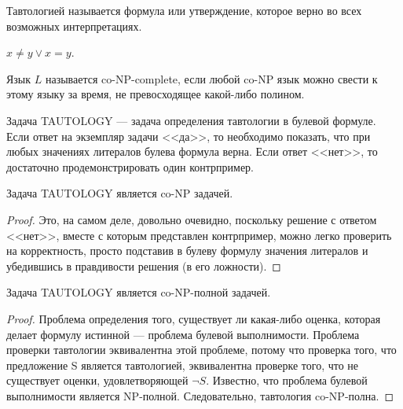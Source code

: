     
    \begin{Def}[Тавтология]
        Тавтологией называется формула или утверждение, которое верно во всех возможных интерпретациях.
    \end{Def}
    
    \begin{Example}
        $x \neq y \lor x = y$.
    \end{Example}
    
    \begin{Def}[co-NP-complete]
        Язык $L$ называется co-NP-complete, если любой co-NP язык можно свести к этому языку за время, не превосходящее какой-либо полином.
    \end{Def}
    
    \begin{Def}
        Задача TAUTOLOGY --- задача определения тавтологии в булевой формуле. Если ответ на экземпляр задачи <<да>>, то необходимо показать, что при любых значениях литералов булева формула верна. Если ответ <<нет>>, то достаточно продемонстрировать один контрпример.
    \end{Def}
    
    \begin{Thm}
        Задача TAUTOLOGY является co-NP задачей.
    \end{Thm}
    
    \begin{proof}
        Это, на самом деле, довольно очевидно, поскольку решение с ответом <<нет>>, вместе с которым представлен контрпример, можно легко проверить на корректность, просто подставив в булеву формулу значения литералов и убедившись в правдивости решения (в его ложности).
    \end{proof}
    
    \begin{Thm}
        Задача TAUTOLOGY является co-NP-полной задачей.
    \end{Thm}
    
    \begin{proof}
        Проблема определения того, существует ли какая-либо оценка, которая делает формулу истинной --- проблема булевой выполнимости. Проблема проверки тавтологии эквивалентна этой проблеме, потому что проверка того, что предложение S является тавтологией, эквивалентна проверке того, что не существует оценки, удовлетворяющей $\lnot S$. Известно, что проблема булевой выполнимости является NP-полной. Следовательно, тавтология co-NP-полна. 
    \end{proof}
    
